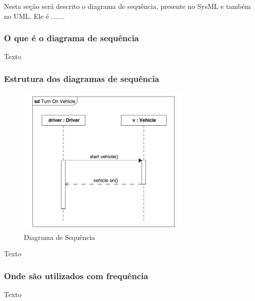 Nesta seção será descrito o diagrama de sequência, presente no SysML e também no UML. Ele é .......


\subsubsection{O que é o diagrama de sequência}
Texto

\subsubsection{Estrutura dos diagramas de sequência}
\begin{figure}[H]
\centering
\includegraphics[width=0.75\textwidth]{figures/diagrama-sequencia.jpeg}
\caption{Diagrama de Sequência}
\end{figure}
Texto

\subsubsection{Onde são utilizados com frequência}
Texto